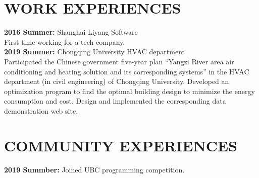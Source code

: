 \documentclass{res}
\begin{document}
\begin{resume}
\section{WORK EXPERIENCES}
    \textbf{2016 Summer:} Shanghai Liyang Software
    \vspace{0.05in}\\
    First time working for a tech company. \\
    \textbf{2019 Summer:} Chongqing University HVAC department
    \vspace{0.05in}\\
    Participated the Chinese government five-year plan ``Yangzi River area air conditioning and heating solution and its corresponding systems'' in the HVAC department (in civil engineering) of Chongqing University. Developed an optimization program to find the optimal building design to minimize the energy consumption and cost. Design and implemented the corresponding data demonstration web site.

\section{COMMUNITY EXPERIENCES}
    \textbf {2019 Summber:} Joined UBC programming competition.
\end{resume}
\end{document}
